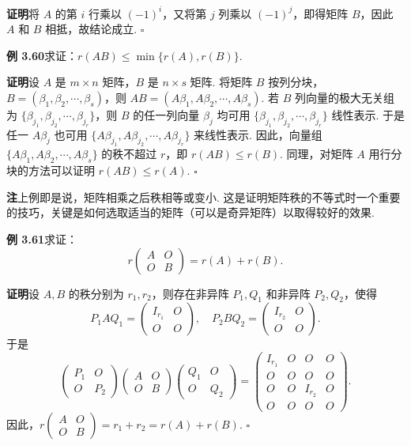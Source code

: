 \documentclass[UTF8,12pt,a4paper,fontset=fandol]{ctexart}
\begin{document}
\noindent\textbf{证明}\quad 将 $A$ 的第 $i$ 行乘以 $(-1)^i$，又将第 $j$ 列乘以 $(-1)^j$，即得矩阵 $B$，因此 $A$ 和 $B$ 相抵，故结论成立. $\square$

\noindent\textbf{例 3.60}\quad 求证：$r(AB)\le \min\{r(A),r(B)\}$.

\noindent\textbf{证明}\quad 设 $A$ 是 $m\times n$ 矩阵，$B$ 是 $n\times s$ 矩阵. 将矩阵 $B$ 按列分块，$B=(\beta_1,\beta_2,\cdots,\beta_s)$，则 $AB=(A\beta_1,A\beta_2,\cdots,A\beta_s)$. 若 $B$ 列向量的极大无关组为 $\{\beta_{j_1},\beta_{j_2},\cdots,\beta_{j_r}\}$，则 $B$ 的任一列向量 $\beta_j$ 均可用 $\{\beta_{j_1},\beta_{j_2},\cdots,\beta_{j_r}\}$ 线性表示. 于是任一 $A\beta_j$ 也可用 $\{A\beta_{j_1},A\beta_{j_2},\cdots,A\beta_{j_r}\}$ 来线性表示. 因此，向量组 $\{A\beta_1,A\beta_2,\cdots,A\beta_s\}$ 的秩不超过 $r$，即 $r(AB)\le r(B)$. 同理，对矩阵 $A$ 用行分块的方法可以证明 $r(AB)\le r(A)$. $\square$

\noindent\textbf{注}\quad 上例即是说，矩阵相乘之后秩相等或变小. 这是证明矩阵秩的不等式时一个重要的技巧，关键是如何选取适当的矩阵（可以是奇异矩阵）以取得较好的效果.

\noindent\textbf{例 3.61}\quad 求证：
\[
r\begin{pmatrix}A&O\\O&B\end{pmatrix}=r(A)+r(B).
\]

\noindent\textbf{证明}\quad 设 $A,B$ 的秩分别为 $r_1,r_2$，则存在非异阵 $P_1,Q_1$ 和非异阵 $P_2,Q_2$，使得
\[
P_1AQ_1=\begin{pmatrix}I_{r_1}&O\\O&O\end{pmatrix},\quad
P_2BQ_2=\begin{pmatrix}I_{r_2}&O\\O&O\end{pmatrix}.
\]
于是
\[
\begin{pmatrix}P_1&O\\O&P_2\end{pmatrix}
\begin{pmatrix}A&O\\O&B\end{pmatrix}
\begin{pmatrix}Q_1&O\\O&Q_2\end{pmatrix}
=
\begin{pmatrix}
I_{r_1}&O&O&O\\
O&O&O&O\\
O&O&I_{r_2}&O\\
O&O&O&O
\end{pmatrix}.
\]
因此，$r\begin{pmatrix}A&O\\O&B\end{pmatrix}=r_1+r_2=r(A)+r(B)$. $\square$
\end{document}
